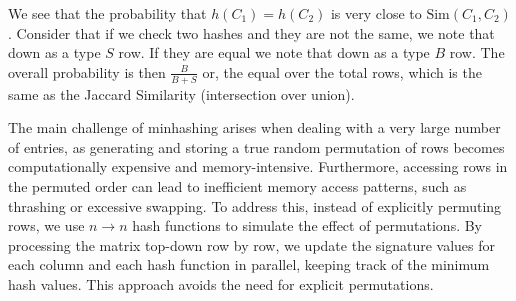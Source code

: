 We see that the probability that $h(C_1) = h(C_2)$ is very close to
$\text{Sim}(C_1, C_2)$. Consider that if we check two hashes and they
are not the same, we note that down as a type $S$ row. If they are equal
we note that down as a type $B$ row. The overall probability is then
$\frac{B}{B + S}$ or, the equal over the total rows, which is the same
as the Jaccard Similarity (intersection over union).

The main challenge of minhashing arises when dealing with a very
large number of entries, as generating and storing a true random
permutation of rows becomes computationally expensive and
memory-intensive. Furthermore, accessing rows in the permuted order
can lead to inefficient memory access patterns, such as thrashing or
excessive swapping. To address this, instead of explicitly permuting
rows, we use $n \rightarrow n$ hash functions to simulate the effect
of permutations. By processing the matrix top-down row by row, we
update the signature values for each column and each hash function in
parallel, keeping track of the minimum hash values. This approach
avoids the need for explicit permutations.

\begin{definition}[]
  
\end{definition}

